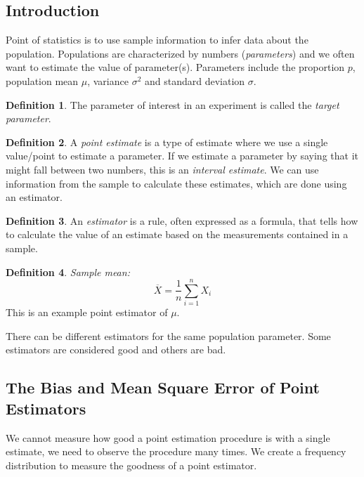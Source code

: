 \documentclass[12 pt]{article}
\theoremstyle{definition}
\newtheorem{defn}{Definition}
\begin{document}
        \subsection{Introduction}
        Point of statistics is to use sample information to infer data
        about the population. Populations are characterized by numbers
        (\textit{parameters}) and we often want to estimate the value
        of parameter(s). Parameters include the proportion $p$,
        population mean $\mu$, variance $\sigma^2$ and standard
        deviation $\sigma$.
        \begin{defn}
          The parameter of interest in an experiment is called the
          \textit{target parameter}.
        \end{defn}
        \begin{defn}
          A \textit{point estimate} is a type of estimate where we use
          a single value/point to estimate a parameter. If we estimate
          a parameter by saying that it might fall between two
          numbers, this is an \textit{interval estimate}. We can use
          information from the sample to calculate these estimates,
          which are done using an estimator.
        \end{defn}
        \begin{defn}
          An \textit{estimator} is a rule, often expressed as a
          formula, that tells how to calculate the value of an
          estimate based on the measurements contained in a sample.
        \end{defn}
        \begin{defn}
          \textit{Sample mean:}
          $$\overline{X} = \frac{1}{n} \sum_{i=1}^n X_i$$ This is an
          example point estimator of $\mu$.
        \end{defn}
        There can be different estimators for the same population
        parameter. Some estimators are considered good and others are bad.
        \subsection{The Bias and Mean Square Error of Point
          Estimators}
        We cannot measure how good a point estimation procedure is
        with a single estimate, we need to observe the procedure many
        times. We create a frequency distribution to measure the
        goodness of a point estimator.
\end{document}
